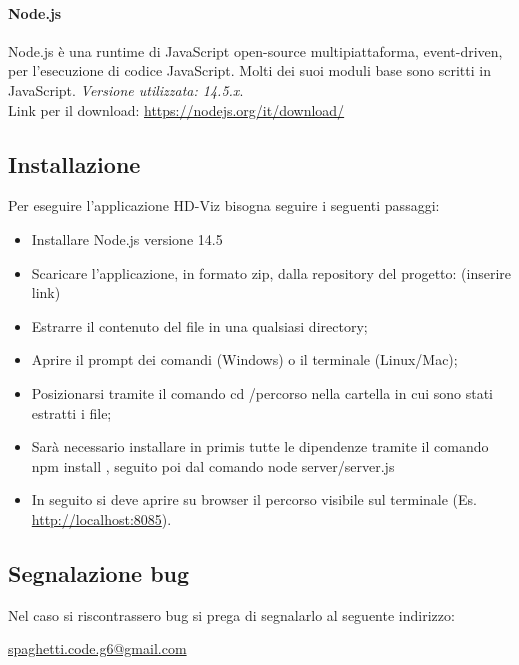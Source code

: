 \documentclass[../manuale_utente.tex]{subfiles}
\begin{document}
\paragraph{Node.js}
    \label{par:node}
Node.js è una runtime di JavaScript open-source multipiattaforma, event-driven, per l’esecuzione di codice JavaScript. Molti dei suoi moduli base sono scritti in JavaScript. 
\emph{Versione utilizzata: 14.5.x}.\\
Link per il download: \url{https://nodejs.org/it/download/}

\subsection{Installazione}
    \label{sub:inst}


Per eseguire l’applicazione HD-Viz bisogna seguire i seguenti passaggi:
\begin{itemize}
\item Installare Node.js versione 14.5
\item Scaricare l’applicazione, in formato zip, dalla repository del progetto: (inserire link)
\item Estrarre il contenuto del file in una qualsiasi directory; 
\item Aprire il prompt dei comandi (Windows) o il terminale (Linux/Mac); 
\item Posizionarsi tramite il comando cd /percorso nella cartella in cui sono stati estratti i file;
\item Sarà necessario installare in primis tutte le dipendenze tramite il comando npm install , seguito poi dal comando node server/server.js
\item In seguito si deve aprire su browser il percorso visibile sul terminale (Es. \url{http://localhost:8085}).
\end{itemize}


\subsection{Segnalazione bug}
Nel caso si riscontrassero bug si prega di segnalarlo al seguente indirizzo:\\
\begin{center}\href{mailto:spaghetti.code.g6@gmail.com}{spaghetti.code.g6@gmail.com}\end{center}
\end{document}
